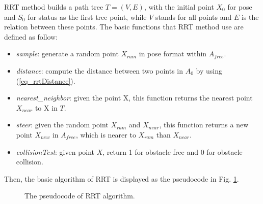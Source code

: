 \documentclass[letterpaper, 10 pt, conference]{ieeeconf}  %
\begin{document}
RRT method builds a path tree $T = (V, E)$, with the initial point $X_{0}$ for pose and $S_{0}$ for status as the first tree point, while $V$ stands for all points and $E$ is the relation between these points. The basic functions that RRT method use are defined as follow:

\begin{itemize}

\item \textit{sample}:  generate a random point $X_{ram}$ in pose format within $A_{free}$.

\item \textit{distance}:  compute the distance between two points in $A_{0}$ by using (\ref{eq_rrtDistance}).

\item \textit{nearest\_neighbor}: given the point X, this function returns the nearest point $X_{near}$ to X in $T$.

\item \textit{steer}: given the random point $X_{ram}$ and $X_{near}$, this function returns a new point $X_{new}$ in $A_{free}$, which is nearer to $X_{ram}$ than $X_{near}$.

\item \textit{collisionTest}: given point $X$, return 1 for obstacle free and 0 for obstacle collision.

\end{itemize}

Then, the basic algorithm of RRT is displayed as the pseudocode in Fig. \ref{fig_rrt}.

\begin{figure}[thpb]
      \centering
      \caption{The pseudocode of RRT algorithm.}
      \label{fig_rrt}
\end{figure}
\end{document}
